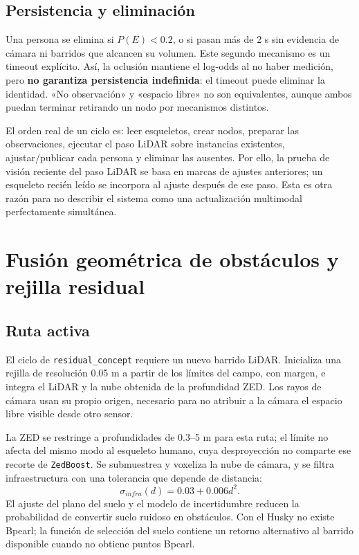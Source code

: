 \documentclass[11pt,a4paper]{article}
\newcommand{\code}[1]{\nolinkurl{#1}}
\begin{document}
\subsection{Persistencia y eliminación}
Una persona se elimina si $P(E)<0.2$, o si pasan más de 2 s sin evidencia de cámara
ni barridos que alcancen su volumen. Este segundo mecanismo es un timeout explícito.
Así, la oclusión mantiene el log-odds al no haber medición, pero \textbf{no garantiza
persistencia indefinida}: el timeout puede eliminar la identidad. «No observación»
y «espacio libre» no son equivalentes, aunque ambos puedan terminar retirando un
nodo por mecanismos distintos.~\cite{humanworker,humanconfig}

El orden real de un ciclo es: leer esqueletos, crear nodos, preparar las observaciones,
ejecutar el paso LiDAR sobre instancias existentes, ajustar/publicar cada persona y
eliminar las ausentes. Por ello, la prueba de visión reciente del paso LiDAR se basa
en marcas de ajustes anteriores; un esqueleto recién leído se incorpora al ajuste
después de ese paso. Esta es otra razón para no describir el sistema como una
actualización multimodal perfectamente simultánea.~\cite{humanworker}

\section{Fusión geométrica de obstáculos y rejilla residual}
\label{sec:grid}

\subsection{Ruta activa}
El ciclo de \code{residual_concept} requiere un nuevo barrido LiDAR. Inicializa una
rejilla de resolución 0.05 m a partir de los límites del campo, con margen, e integra
el LiDAR y la nube obtenida de la profundidad ZED. Los rayos de cámara usan su propio
origen, necesario para no atribuir a la cámara el espacio libre visible desde otro
sensor.~\cite{resworker,grid,resconfig}

La ZED se restringe a profundidades de 0.3--5 m para esta ruta; el límite no afecta
del mismo modo al esqueleto humano, cuya desproyección no comparte ese recorte de
\code{ZedBoost}. Se submuestrea y voxeliza la nube de cámara, y se filtra
infraestructura con una tolerancia que depende de distancia:
\begin{equation}
 \sigma_{infra}(d)=0.03+0.006d^2.
\end{equation}
El ajuste del plano del suelo y el modelo de incertidumbre reducen la probabilidad
de convertir suelo ruidoso en obstáculos. Con el Husky no existe Bpearl; la función
de selección del suelo contiene un retorno alternativo al barrido disponible
cuando no obtiene puntos Bpearl.~\cite{resworker,resconfig,zedboost}
\end{document}
